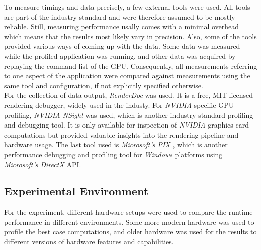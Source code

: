 To measure timings and data precisely, a few external tools were used. All tools are part of the industry 
standard and were therefore assumed to be mostly reliable. Still, measuring performance usally comes with 
a minimal overhead which means that the results most likely vary in precision. Also, some of the tools 
provided various ways of coming up with the data. Some data was measured while the profiled application 
was running, and other data was acquired by replaying the command list of the \ac{GPU}. Consequently, all 
measurements referring to one aspect of the application were compared against measurements using the same 
tool and configuration, if not explicitly specified otherwise. \\

\noindent
For the collection of data output, \emph{RenderDoc} \cite{RenderDoc} was used. It is a free, MIT licensed 
rendering debugger, widely used in the industy. For \emph{NVIDIA} specific \ac{GPU} profiling, \emph{NVIDIA NSight} 
\cite{NSight} was used, which is another industry standard profiling and debugging tool. It is only available for 
inspection of \emph{NVIDIA} graphics card computations but provided valuable insights into the rendering pipeline 
and hardware usage. The last tool used is \emph{Microsoft's PIX} \cite{PIX}, which is another performance debugging 
and profiling tool for \emph{Windows} platforms using \emph{Microsoft's DirectX} \ac{API}.


\subsection*{Experimental Environment} \label{sec-experimental-environment}

For the experiment, different hardware setups were used to compare the runtime performance in different environments.
Some more modern hardware was used to profile the best case computations, and older hardware was used for the results 
to different versions of hardware features and capabilities.

